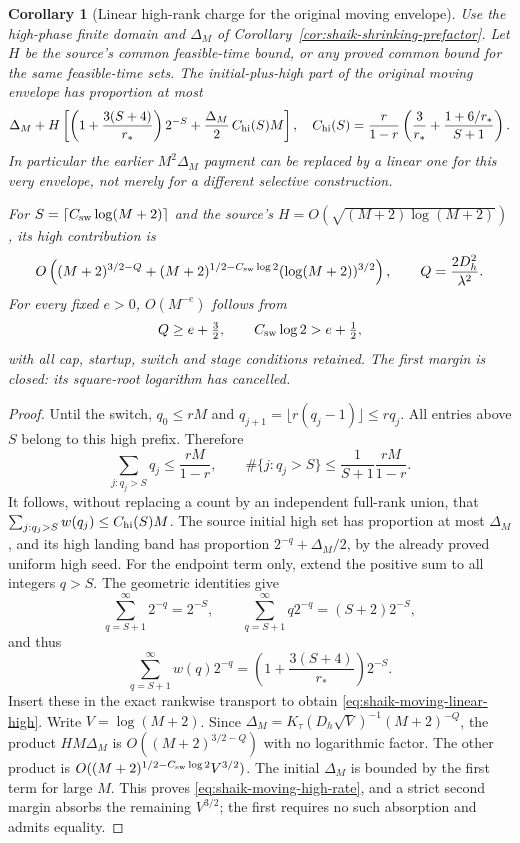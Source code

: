 \documentclass[11pt]{article}
\newtheorem{corollary}[proposition]{Corollary}
\theoremstyle{remark}\newtheorem{remark}[proposition]{Remark}
\begin{document}
\begin{corollary}[Linear high-rank charge for the original moving envelope]
\label{cor:shaik-moving-linear-high}
Use the high-phase finite domain and \(\Delta_M\) of
Corollary~\ref{cor:shaik-shrinking-prefactor}. Let \(H\) be the source's
common feasible-time bound, or any proved common bound for the
same feasible-time sets. The initial-plus-high part of the original
moving envelope has proportion at most
\begin{equation}\label{eq:shaik-moving-linear-high}
 \Delta_M+H\left[
 \left(1+\frac{3(S+4)}{r_*}\right)2^{-S}
       +\frac{\Delta_M}{2}\,C_{\rm hi}(S)M\right],
 \quad
 C_{\rm hi}(S)=\frac r{1-r}
       \left(\frac3{r_*}+\frac{1+6/r_*}{S+1}\right).
\end{equation}
In particular the earlier \(M^2\Delta_M\) payment can be replaced
by a linear one for this very envelope, not merely for a different
selective construction.

For \(S=\lceil C_{\rm sw}\log(M+2)\rceil\) and the source's
\(H=O(\sqrt{(M+2)\log(M+2)})\), its high contribution is
\begin{equation}\label{eq:shaik-moving-high-rate}
 O\left((M+2)^{3/2-Q}
       +(M+2)^{1/2-C_{\rm sw}\log2}
                     (\log(M+2))^{3/2}\right),
 \qquad Q=\frac{2D_h^2}{\lambda^2}.
\end{equation}
For every fixed \(e>0\), \(O(M^{-e})\) follows from
\begin{equation}\label{eq:shaik-moving-high-closed-margin}
 Q\ge e+\tfrac32,\qquad C_{\rm sw}\log2>e+\tfrac12,
\end{equation}
with all cap, startup, switch and stage conditions retained.
The first margin is closed: its square-root logarithm has cancelled.
\end{corollary}
\begin{proof}
Until the switch, \(q_0\le rM\) and
\(q_{j+1}=\lfloor r(q_j-1)\rfloor\le rq_j\).
All entries above \(S\) belong to this high prefix. Therefore
\[
 \sum_{j:q_j>S}q_j\le\frac{rM}{1-r},
 \qquad
 \#\{j:q_j>S\}\le\frac1{S+1}\frac{rM}{1-r}.
\]
It follows, without replacing a count by an independent full-rank
union, that \(\sum_{j:q_j>S}w(q_j)\le C_{\rm hi}(S)M\).
The source initial high set has proportion at most \(\Delta_M\),
and its high landing band has proportion
\(2^{-q}+\Delta_M/2\), by the already proved uniform high seed.
For the endpoint term only, extend the positive sum to all integers
\(q>S\). The geometric identities give
\[
 \sum_{q=S+1}^\infty2^{-q}=2^{-S},\qquad
 \sum_{q=S+1}^\infty q2^{-q}=(S+2)2^{-S},
\]
and thus
\[
 \sum_{q=S+1}^\infty w(q)2^{-q}
       =\left(1+\frac{3(S+4)}{r_*}\right)2^{-S}.
\]
Insert these in the exact rankwise transport to obtain
\eqref{eq:shaik-moving-linear-high}.
Write \(V=\log(M+2)\). Since
\(\Delta_M=K_\tau(D_h\sqrt V)^{-1}(M+2)^{-Q}\),
the product \(HM\Delta_M\) is
\(O((M+2)^{3/2-Q})\) with no logarithmic factor.
The other product is
\(O((M+2)^{1/2-C_{\rm sw}\log2}V^{3/2})\).
The initial \(\Delta_M\) is bounded by the first term for large \(M\).
This proves \eqref{eq:shaik-moving-high-rate}, and a strict second
margin absorbs the remaining \(V^{3/2}\); the first requires no
such absorption and admits equality.
\end{proof}
\end{document}
